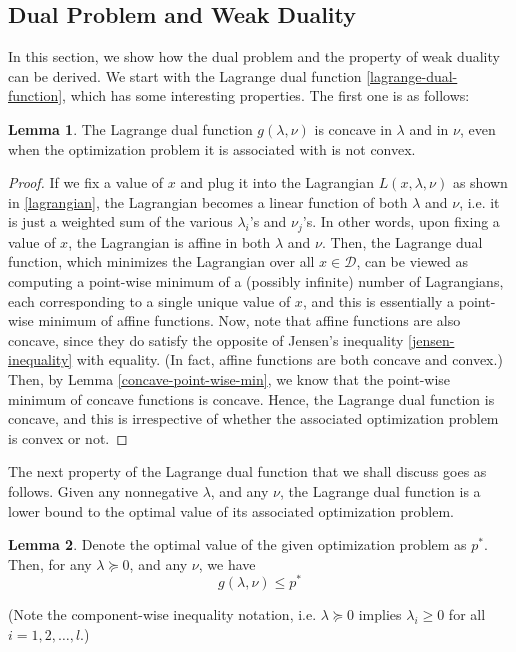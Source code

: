 \documentclass[a4paper]{article}
\theoremstyle{definition}
\newtheorem{lemma}{Lemma}[subsection]
\begin{document}
\subsection{Dual Problem and Weak Duality}
\label{derivation-duality}

In this section, we show how the dual problem and the property of weak duality can be derived.
We start with the Lagrange dual function \eqref{lagrange-dual-function}, which has some interesting properties.
The first one is as follows:
\begin{lemma}
	\label{dual-function-concave}
	The Lagrange dual function $g(\lambda, \nu)$ is concave in $\lambda$ and in $\nu$, even when the optimization problem it is associated with is not convex.
\end{lemma}
\begin{proof}
	If we fix a value of $x$ and plug it into the Lagrangian $L(x, \lambda, \nu)$ as shown in \eqref{lagrangian}, the Lagrangian becomes a linear function of both $\lambda$ and $\nu$, i.e. it is just a weighted sum of the various $\lambda_i$'s and $\nu_j$'s.
	In other words, upon fixing a value of $x$, the Lagrangian is affine in both $\lambda$ and $\nu$.
	Then, the Lagrange dual function, which minimizes the Lagrangian over all $x \in \mathcal{D}$, can be viewed as computing a point-wise minimum of a (possibly infinite) number of Lagrangians, each corresponding to a single unique value of $x$, and this is essentially a point-wise minimum of affine functions.
	Now, note that affine functions are also concave, since they do satisfy the opposite of Jensen's inequality \eqref{jensen-inequality} with equality.
	(In fact, affine functions are both concave and convex.)
	Then, by Lemma \ref{concave-point-wise-min}, we know that the point-wise minimum of concave functions is concave.
	Hence, the Lagrange dual function is concave, and this is irrespective of whether the associated optimization problem is convex or not.
\end{proof}

The next property of the Lagrange dual function that we shall discuss goes as follows.
Given any nonnegative $\lambda$, and any $\nu$, the Lagrange dual function is a lower bound to the optimal value of its associated optimization problem.

\begin{lemma}
	\label{dual-function-lower-bound}
	Denote the optimal value of the given optimization problem as $p^*$.
	Then, for any $\lambda \succeq 0$, and any $\nu$, we have
	\begin{equation*}
		g(\lambda, \nu) \leq p^*
	\end{equation*}
\end{lemma}
(Note the component-wise inequality notation, i.e. $\lambda \succeq 0$ implies $\lambda_i \geq 0$ for all $i = 1, 2, \dots, l$.)
\end{document}
